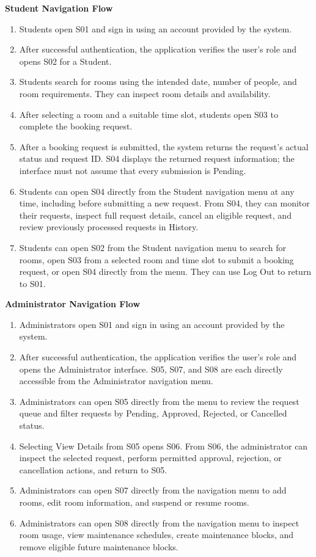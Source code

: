 \textbf{Student Navigation Flow}

\begin{enumerate}
\def\labelenumi{\arabic{enumi}.}
\item
  Students open S01 and sign in using an account provided by the system.
\item
  After successful authentication, the application verifies the
  user's role and opens S02 for a Student.
\item
  Students search for rooms using the intended date, number of people,
  and room requirements. They can inspect room details and availability.
\item
  After selecting a room and a suitable time slot, students open S03 to
  complete the booking request.
\item
  After a booking request is submitted, the system returns the
  request's actual status and request ID. S04 displays
  the returned request information; the interface must not assume that
  every submission is Pending.
\item
  Students can open S04 directly from the Student navigation menu at any
  time, including before submitting a new request. From S04, they can
  monitor their requests, inspect full request details, cancel an
  eligible request, and review previously processed requests in History.
\item
  Students can open S02 from the Student navigation menu to search for
  rooms, open S03 from a selected room and time slot to submit a booking
  request, or open S04 directly from the menu. They can use Log Out to
  return to S01.
\end{enumerate}

\textbf{Administrator Navigation Flow}

\begin{enumerate}
\def\labelenumi{\arabic{enumi}.}
\item
  Administrators open S01 and sign in using an account provided by the
  system.
\item
  After successful authentication, the application verifies the
  user's role and opens the Administrator interface.
  S05, S07, and S08 are each directly accessible from the Administrator
  navigation menu.
\item
  Administrators can open S05 directly from the menu to review the
  request queue and filter requests by Pending, Approved, Rejected, or
  Cancelled status.
\item
  Selecting View Details from S05 opens S06. From S06, the administrator
  can inspect the selected request, perform permitted approval,
  rejection, or cancellation actions, and return to S05.
\item
  Administrators can open S07 directly from the navigation menu to add
  rooms, edit room information, and suspend or resume rooms.
\item
  Administrators can open S08 directly from the navigation menu to
  inspect room usage, view maintenance schedules, create maintenance
  blocks, and remove eligible future maintenance blocks.
\end{enumerate}

